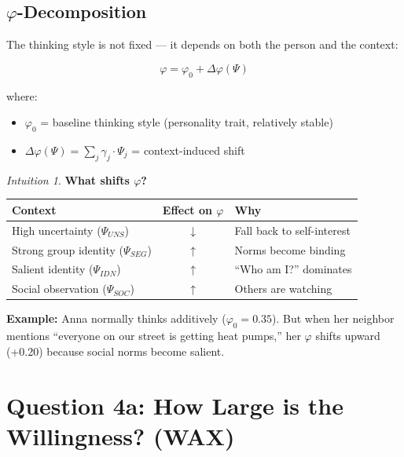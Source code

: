 \documentclass[11pt,a4paper]{book}
\theoremstyle{definition}
\theoremstyle{remark}
\newtheorem*{intuition}{Intuition}
\begin{document}
\subsection{$\varphi$-Decomposition}

The thinking style is not fixed — it depends on both the person and the context:

\begin{equation}
\boxed{\varphi = \varphi_0 + \Delta\varphi(\Psi)}
\end{equation}

where:
\begin{itemize}
\item $\varphi_0$ = baseline thinking style (personality trait, relatively stable)
\item $\Delta\varphi(\Psi) = \sum_j \gamma_j \cdot \Psi_j$ = context-induced shift
\end{itemize}

\begin{intuition}
\textbf{What shifts $\varphi$?}

\begin{center}
\begin{tabular}{lcp{6cm}}
\toprule
\textbf{Context} & \textbf{Effect on $\varphi$} & \textbf{Why}\\
\midrule
High uncertainty ($\Psi_{UNS}$) & $\downarrow$ & Fall back to self-interest\\
Strong group identity ($\Psi_{SEG}$) & $\uparrow$ & Norms become binding\\
Salient identity ($\Psi_{IDN}$) & $\uparrow$ & ``Who am I?'' dominates\\
Social observation ($\Psi_{SOC}$) & $\uparrow$ & Others are watching\\
\bottomrule
\end{tabular}
\end{center}

\textbf{Example:} Anna normally thinks additively ($\varphi_0 = 0.35$). But when her neighbor mentions ``everyone on our street is getting heat pumps,'' her $\varphi$ shifts upward (+0.20) because social norms become salient.
\end{intuition}

\section{Question 4a: How Large is the Willingness? (WAX)}
\label{sec:12-wax}
\end{document}
